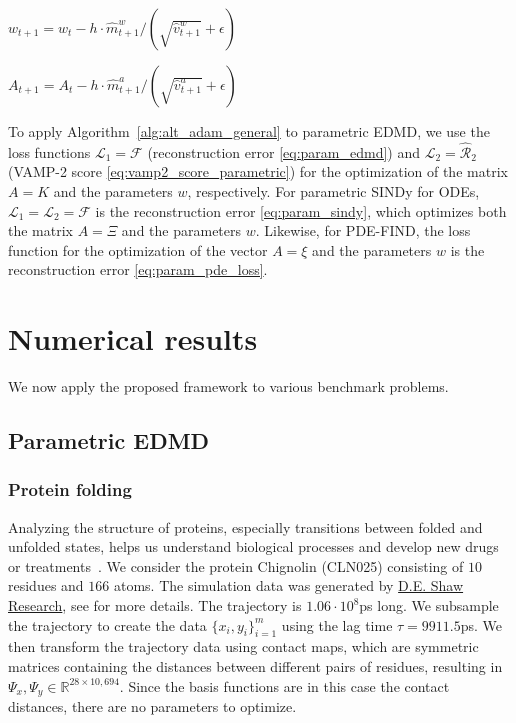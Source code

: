 \documentclass
[
    a4paper,
    DIV=11,
    abstract=true,
    11pt,
]
{scrartcl}
\newcommand{\R}{\mathbb{R}}                                      %
\newcommand{\ts}{\hspace*{0.1em}}                                %
\theoremstyle{definition}
\begin{document}
\begin{algorithm}[h!]
\begin{algorithmic}
\State $w_{t+1} = w_t - h \cdot \hat{m}_{t+1}^w/(\sqrt{\hat{v}_{t+1}^w} + \epsilon)$  

\State $A_{t+1} = A_{t} - h \cdot \hat{m}_{t+1}^a/(\sqrt{\hat{v}_{t+1}^a} + \epsilon)$ 

\EndWhile
\end{algorithmic}
\label{alg:alt_adam_general}
\end{algorithm}

To apply Algorithm~\ref{alg:alt_adam_general} to parametric EDMD, we use the loss functions $\mathcal{L}_1 = \mathcal{F}$ (reconstruction error \eqref{eq:param_edmd}) and $\mathcal{L}_2 = \mathcal{\hat{R}}_2$ (VAMP-2 score \eqref{eq:vamp2_score_parametric}) for the optimization of the matrix $A = K$ and the parameters $w$, respectively. For parametric SINDy for ODEs, $\mathcal{L}_1 = \mathcal{L}_2 = \mathcal{F}$ is the reconstruction error \eqref{eq:param_sindy}, which optimizes both the matrix $A = \Xi$ and the parameters $w$. Likewise, for PDE-FIND, the loss function for the optimization of the vector $A = \xi$ and the parameters $w$ is the reconstruction error \eqref{eq:param_pde_loss}.


\section{Numerical results}
\label{sec:numerical}

We now apply the proposed framework to various benchmark problems.

\subsection{Parametric EDMD}

\subsubsection{Protein folding}

Analyzing the structure of proteins, especially transitions between folded and unfolded states, helps us understand biological processes and develop new drugs or treatments~\cite{dill2008protein}. We consider the protein Chignolin (CLN025) consisting of $10$ residues and $166$ atoms. The simulation data was generated by \href{https://www.deshawresearch.com/}{D.E. Shaw Research}, see \cite{lindorff2011fast} for more details. The trajectory is $1.06 \cdot 10^8$\ts ps long. We subsample the trajectory to create the data $\{x_i, y_i\}_{i=1}^m$ using the lag time $\tau=9911.5$\ts ps. We then transform the trajectory data using contact maps, which are symmetric matrices containing the distances between different pairs of residues, resulting in $\Psi_x, \Psi_y \in \R^{28 \times 10,694}$. Since the basis functions are in this case the contact distances, there are no parameters to optimize.
\end{document}
